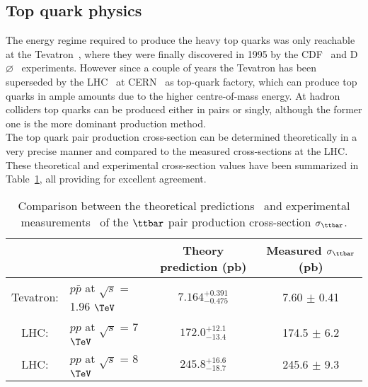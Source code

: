 \subsection{Top quark physics}
The energy regime required to produce the heavy top quarks was only reachable at the Tevatron~\cite{Tevatron}, where they were finally discovered in 1995 by the CDF~\cite{CDF} and D$\varnothing$~\cite{D0} experiments. However since a couple of years the Tevatron has been superseded by the LHC~\cite{} at CERN~\cite{CERN} as top-quark factory, which can produce top quarks in ample amounts due to the higher centre-of-mass energy. %
At hadron colliders top quarks can be produced either in pairs or singly, although the former one is the more dominant production method.
\\
The top quark pair production cross-section can be determined theoretically in a very precise manner and compared to the measured cross-sections at the LHC. These theoretical and experimental cross-section values have been summarized in Table~\ref{table::XSTopPair}, all providing for excellent agreement. %
\begin{table}[h!t]
 \centering
 \caption{Comparison between the theoretical predictions~\cite{CzakonTopPairXS, CzakonGluonPDF} and experimental measurements~\cite{TevatronTTbarXS, CMSTTbarXS} of the $\ttbar$ pair production cross-section $\sigma_{\ttbar}$.} \label{table::XSTopPair}
 \begin{tabular}{|cl|c|c|}
  \hline
		&						& Theory prediction (pb) 	& Measured $\sigma_{\ttbar}$ (pb) 	\\
  \hline						
  Tevatron: 	& $p\bar{p}$ at $\sqrt{s}$ = 1.96 $\TeV$ 	& $7.164^{+0.391}_{-0.475}$	& 7.60 $\pm$ 0.41			\\
  LHC: 		& $pp$ at $\sqrt{s}$ = 7 $\TeV$ 		& $172.0^{+12.1}_{-13.4}$	& 174.5 $\pm$ 6.2			\\
  LHC: 		& $pp$ at $\sqrt{s}$ = 8 $\TeV$ 		& $245.8^{+16.6}_{-18.7}$	& 245.6 $\pm$ 9.3			\\
  \hline
 \end{tabular}
\end{table}

